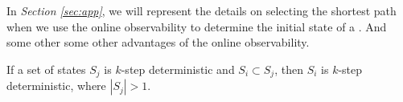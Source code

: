 In {\em Section \ref{sec:app}}, we will represent the details on selecting the shortest path when we use the online observability to determine the initial state of a \BCN. And some other some other advantages of the online observability.





\begin{lemma}
 If a set of states $S_j$ is $k$-step deterministic and $S_i\subset S_j$, then $S_i$ is $k$-step deterministic, where $|S_j|>1$.
  \label{lemm:4}
\end{lemma}
